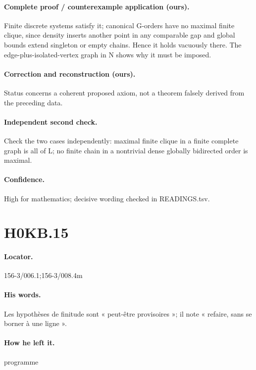 \paragraph{Complete proof / counterexample application (ours).} Finite discrete systems satisfy it; canonical G-orders have no maximal finite clique, since density inserts another point in any comparable gap and global bounds extend singleton or empty chains. Hence it holds vacuously there. The edge-plus-isolated-vertex graph in N shows why it must be imposed.

\paragraph{Correction and reconstruction (ours).} Status concerns a coherent proposed axiom, not a theorem falsely derived from the preceding data.

\paragraph{Independent second check.} Check the two cases independently: maximal finite clique in a finite complete graph is all of L; no finite chain in a nontrivial dense globally bidirected order is maximal.

\paragraph{Confidence.} High for mathematics; decisive wording checked in READINGS.tsv.

\section*{H0KB.15}\label{statement:H0KB.15}
\paragraph{Locator.} 156-3/006.1;156-3/008.4m

\paragraph{His words.} Les hypothèses de finitude sont « peut-être provisoires »; il note « refaire, sans se borner à une ligne ».

\paragraph{How he left it.} programme


